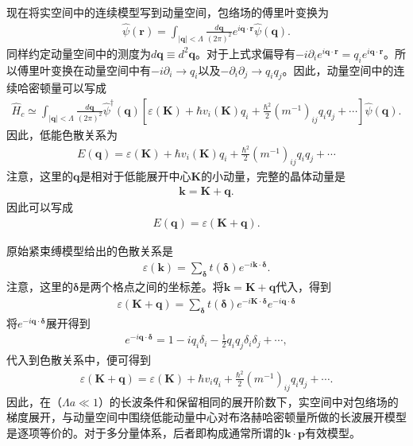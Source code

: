 \documentclass[10pt, oneside]{article}
\begin{document}
现在将实空间中的连续模型写到动量空间，包络场的傅里叶变换为
\begin{align}
	\hat{\psi} \left(\bm{r}\right)	= \int_{\left|\bm{q}\right| < \Lambda} \frac{d \bm{q}}{\left(2 \pi\right)^{2}}  e^{i \bm{q} \cdot \bm{r}} \hat{\psi} \left(\bm{q}\right).
\end{align}
同样约定动量空间中的测度为\(d \bm{q} \equiv d^{2} \bm{q}\)。对于上式求偏导有\(- i \partial_{i} e^{i \bm{q} \cdot \bm{r}}  = q_i e^{i \bm{q} \cdot \bm{r}}\)。所以傅里叶变换在动量空间中有\(-i \partial_{i} \rightarrow q_i\)以及\(- \partial_i \partial_j \rightarrow q_i q_j\)。因此，动量空间中的连续哈密顿量可以写成
\begin{align}
	\boxed{
		\hat{H}_{c} \simeq \int_{\left|\bm{q}\right| < \Lambda} \frac{d \bm{q}}{\left(2 \pi\right)^{2}}  \hat{\psi}^{\dagger} \left(\bm{q}\right) \left[\varepsilon \left(\bm{K}\right) + \hbar v_i \left(\bm{K}\right) q_i + \frac{\hbar^2}{2} \left(m^{-1}\right)_{ij} q_i q_j + \cdots \right] \hat{\psi} \left(\bm{q}\right)
	}.
\end{align} 
因此，低能色散关系为
\begin{align}
	E \left(\bm{q}\right) = \varepsilon \left(\bm{K}\right) + \hbar v_i \left(\bm{K}\right) q_i + \frac{\hbar^2}{2} \left(m^{-1}\right)_{ij} q_i q_j + \cdots
\end{align}
注意，这里的\(\bm{q}\)是相对于低能展开中心\(\bm{K}\)的小动量，完整的晶体动量是
\begin{align}
	\boxed{
		\bm{k} = \bm{K} + \bm{q}	
	}.
\end{align}
因此可以写成
\begin{align}
	\boxed{
		E \left(\bm{q}\right) = \varepsilon \left(\bm{K} + \bm{q}\right)
	}.
\end{align}

原始紧束缚模型给出的色散关系是
\begin{align}
	\varepsilon \left(\bm{k}\right) = \sum_{\bm{\delta}} t \left(\bm{\delta}\right) e^{-i \bm{k} \cdot \bm{\delta}}.
\end{align}
注意，这里的\(\bm{\delta}\)是两个格点之间的坐标差。将\(\bm{k} = \bm{K} + \bm{q}\)代入，得到
\begin{align}
	\varepsilon \left(\bm{K} + \bm{q}\right) = \sum_{\bm{\delta}} t \left(\bm{\delta}\right) e^{-i \bm{K} \cdot \bm{\delta}} e^{-i \bm{q} \cdot \bm{\delta}}
\end{align}
将\(e^{-i \bm{q} \cdot \bm{\delta}}\)展开得到
\begin{align}
	 e^{-i \bm{q} \cdot \bm{\delta}} = 1 - i q_i \delta_{i} - \frac{1}{2} q_i q_j \delta_i \delta_j + \cdots,
\end{align}
代入到色散关系中，便可得到
\begin{align}
	\varepsilon \left(\bm{K + \bm{q}}\right) = \varepsilon \left(\bm{K}\right) + \hbar v_i q_i + \frac{\hbar^{2}}{2} \left(m^{-1}\right)_{ij} q_i q_j + \cdots .
\end{align}
因此，在（\( \Lambda a \ll 1\)）的长波条件和保留相同的展开阶数下，实空间中对包络场的梯度展开，与动量空间中围绕低能动量中心对布洛赫哈密顿量所做的长波展开模型是逐项等价的。对于多分量体系，后者即构成通常所谓的\(\bm{k} \cdot \bm{p}\)有效模型。
\end{document}
